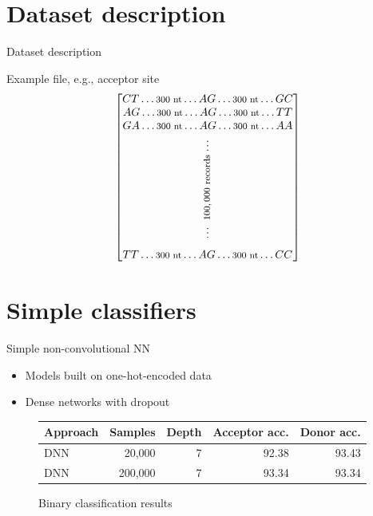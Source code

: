 \documentclass[10pt]{beamer}
\begin{document}
\section{Dataset description}
\begin{frame}{Dataset description}
	
	\large Example file, e.g., acceptor site
	\begin{align*}
	\begin{bmatrix}
	CT \dots \rotatebox{0}{\footnotesize $ 300 $ nt} \dots AG \dots \rotatebox{0}{\footnotesize $ 300 $ nt} \dots GC\\
	AG \dots \rotatebox{0}{\footnotesize $ 300 $ nt} \dots AG \dots \rotatebox{0}{\footnotesize $ 300 $ nt} \dots TT \\
	GA \dots \rotatebox{0}{\footnotesize $ 300 $ nt} \dots AG \dots \rotatebox{0}{\footnotesize $ 300 $ nt} \dots AA \\[0.2ex]
	\vdots\\
	\rotatebox{90}{\footnotesize$ ~100,000 $ records} \\[-1.3ex]
	\vdots \\[1.4ex]
	TT \dots \rotatebox{0}{\footnotesize $ 300 $ nt} \dots AG \dots \rotatebox{0}{\footnotesize $ 300 $ nt} \dots CC
	\end{bmatrix}
	\end{align*}
\end{frame}

\section{Simple classifiers}
\begin{frame}{Simple non-convolutional NN}
	\begin{itemize}
		\item Models built on one-hot-encoded data
		\item Dense networks with dropout
	\end{itemize}
	\begin{figure}
		\centering
		\begingroup
		\def\arraystretch{1.2}
		\begin{tabular}{|l|r|r|r|r|}
			\hline
			Approach & Samples & Depth & Acceptor acc. & Donor acc. \\
			\hline
			DNN & 20,000 & 7 & 92.38 & 93.43 \\
			DNN & 200,000 & 7 & 93.34 & 93.34 \\
			\hline  
		\end{tabular}
		\endgroup
		\caption{Binary classification results}
	\end{figure}
\end{frame}
\end{document}
